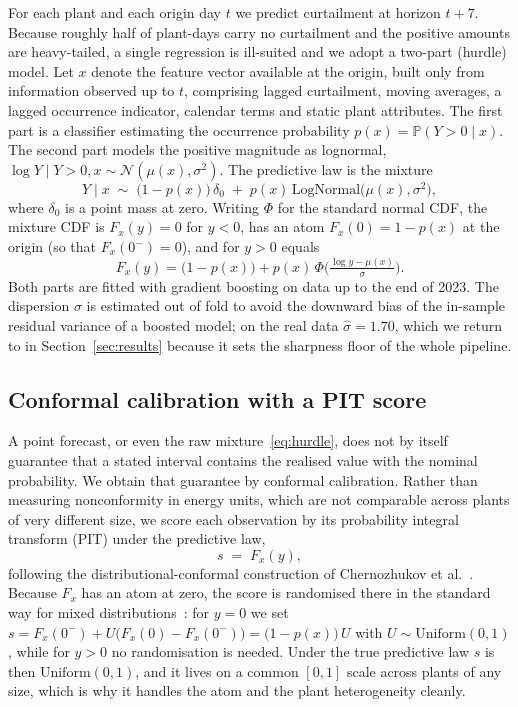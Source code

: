\documentclass[preprint,3p,times]{elsarticle}
\begin{document}
For each plant and each origin day $t$ we predict curtailment at horizon $t+7$. Because roughly half of plant-days carry no curtailment and the positive amounts are heavy-tailed, a single regression is ill-suited and we adopt a two-part (hurdle) model. Let $x$ denote the feature vector available at the origin, built only from information observed up to $t$, comprising lagged curtailment, moving averages, a lagged occurrence indicator, calendar terms and static plant attributes. The first part is a classifier estimating the occurrence probability $p(x)=\mathbb{P}(Y>0\mid x)$. The second part models the positive magnitude as lognormal, $\log Y \mid Y>0, x \sim \mathcal{N}(\mu(x),\sigma^2)$. The predictive law is the mixture
\begin{equation}
Y \mid x \;\sim\; \big(1-p(x)\big)\,\delta_0 \;+\; p(x)\,\mathrm{LogNormal}\big(\mu(x),\sigma^2\big),
\label{eq:hurdle}
\end{equation}
where $\delta_0$ is a point mass at zero. Writing $\Phi$ for the standard normal CDF, the mixture CDF is $F_x(y)=0$ for $y<0$, has an atom $F_x(0)=1-p(x)$ at the origin (so that $F_x(0^-)=0$), and for $y>0$ equals
\begin{equation*}
F_x(y)=\big(1-p(x)\big)+p(x)\,\Phi\!\Big(\tfrac{\log y-\mu(x)}{\sigma}\Big).
\end{equation*}
Both parts are fitted with gradient boosting on data up to the end of 2023. The dispersion $\sigma$ is estimated out of fold to avoid the downward bias of the in-sample residual variance of a boosted model; on the real data $\hat\sigma=1.70$, which we return to in Section~\ref{sec:results} because it sets the sharpness floor of the whole pipeline.

\subsection{Conformal calibration with a PIT score}

A point forecast, or even the raw mixture~\eqref{eq:hurdle}, does not by itself guarantee that a stated interval contains the realised value with the nominal probability. We obtain that guarantee by conformal calibration. Rather than measuring nonconformity in energy units, which are not comparable across plants of very different size, we score each observation by its probability integral transform (PIT) under the predictive law,
\begin{equation}
s \;=\; F_x(y),
\label{eq:pit}
\end{equation}
following the distributional-conformal construction of Chernozhukov et al.~\cite{chernozhukov2021}. Because $F_x$ has an atom at zero, the score is randomised there in the standard way for mixed distributions~\cite{smith1985}: for $y=0$ we set $s=F_x(0^-)+U\big(F_x(0)-F_x(0^-)\big)=\big(1-p(x)\big)\,U$ with $U\sim\mathrm{Uniform}(0,1)$, while for $y>0$ no randomisation is needed. Under the true predictive law $s$ is then $\mathrm{Uniform}(0,1)$, and it lives on a common $[0,1]$ scale across plants of any size, which is why it handles the atom and the plant heterogeneity cleanly.
\end{document}
